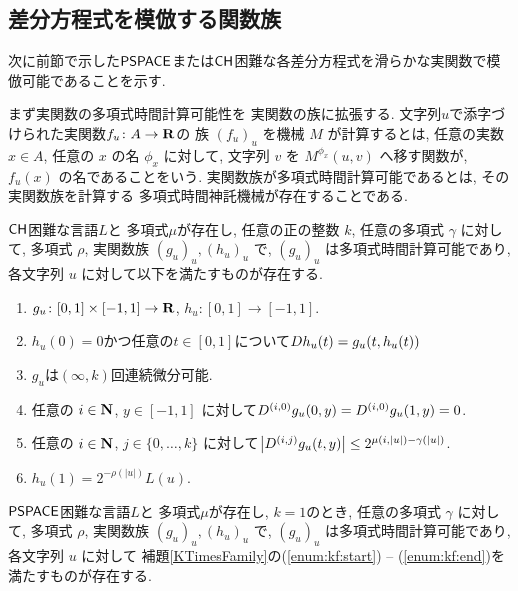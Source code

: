 \subsection{差分方程式を模倣する関数族}
\label{subsection: ode family}
次に前節で示した$\mathsf{PSPACE}$または$\mathsf{CH}$困難な各差分方程式を滑らかな実関数で模倣可能であることを示す.

まず実関数の多項式時間計算可能性を
実関数の族に拡張する.
文字列$u$で添字づけられた実関数$f _u \colon A \to \mathbf R$の
族 $(f_u)_u$ を機械 $M$ が計算するとは,
任意の実数 $x \in A$, 任意の $x$ の名 $\phi_x$ に対して,
文字列 $v$ を $M ^{\phi _x} (u, v)$ へ移す関数が, 
$f _u (x)$ の名であることをいう.
実関数族が多項式時間計算可能であるとは, その実関数族を計算する
多項式時間神託機械が存在することである.

 \begin{lemma}
  \label{KTimesFamily}
  $\mathsf{CH}$困難な言語$L$と
  多項式$\mu$が存在し,
  任意の正の整数 $k$,
  任意の多項式 $\gamma$ に対して,
  多項式 $\rho$, 実関数族 $(g_u)_u, (h_u)_u$ で, 
  $(g_u)_u$ は多項式時間計算可能であり,
  各文字列 $u$ に対して以下を満たすものが存在する.

  \begin{enumerate}
   \item \label{enum:kf:start}
     $g_u\colon [0,1] \times [-1,1]\to \mathbf R$, $h_u\colon [0,1] \to [-1,1]$. 
   \item \label{enum:equation}
	 $h_u(0) = 0$かつ任意の$t \in [0,1]$について$D h_u(t) = g_u(t, h_u(t))$
   \item \label{enum:differentiability}
         $g_u$は$(\infty, k)$回連続微分可能.
   \item \label{enum:boundary}
	 任意の $i \in \mathbf N$, $y \in [-1,1]$ に対して$
	  D^{(i, 0)} g_u(0,y) = D^{(i, 0)} g_u(1,y) = 0
         $.
   \item \label{enum:smooth}
	 任意の $i \in \mathbf N$, $j \in \{0, \dots, k\}$ に対して$
	  \left|D^{(i,j)} g_u(t,y)\right| \le 2^{\mu(i, |u|) - \gamma(|u|)}
         $.
   \item \label{enum:kf:end}
	 $h_u(1) = 2^{-\rho(|u|)} L(u)$.
  \end{enumerate}
 \end{lemma}

\begin{lemma}
 \label{DifferentiableFamily}
 $\mathsf{PSPACE}$困難な言語$L$と
 多項式$\mu$が存在し, 
 $k = 1$のとき,
 任意の多項式 $\gamma$ に対して,
 多項式 $\rho$, 実関数族 $(g_u)_u, (h_u)_u$ で, 
 $(g_u)_u$ は多項式時間計算可能であり,
 各文字列 $u$ に対して
 補題\ref{KTimesFamily}の(\ref{enum:kf:start}) -- (\ref{enum:kf:end})を満たすものが存在する.
\end{lemma}



